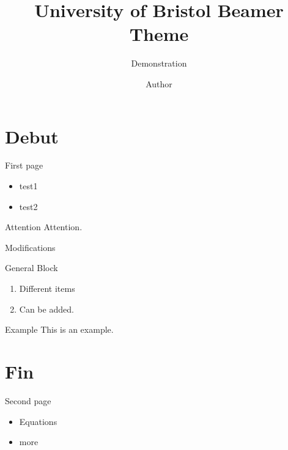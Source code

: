 \documentclass[compress,10pt]{beamer}
\title{University of Bristol Beamer Theme}
\subtitle{Demonstration}
\author{Author}
\begin{document}
\begin{frame}
  \titlepage
\end{frame}
\section{Debut}

\begin{frame}{First page}

\begin{itemize}
\item test1
\item test2
\end{itemize} 
{
\begin{alertblock}{Attention}
  Attention.
\end{alertblock}
}
\end{frame}

\begin{frame}[fragile]{Modifications}
\begin{block}{General Block}
  \begin{enumerate}
  \item Different items
  \item Can be added.
  \end{enumerate}
\end{block}

{
\begin{exampleblock}{Example}
This is an example.
\end{exampleblock}
}
\end{frame}

\section{Fin}

\begin{frame}{Second page}

\begin{itemize}
\item <1-> Equations
\item <2-> more 

\end{itemize}  
\end{frame}
\end{document}
